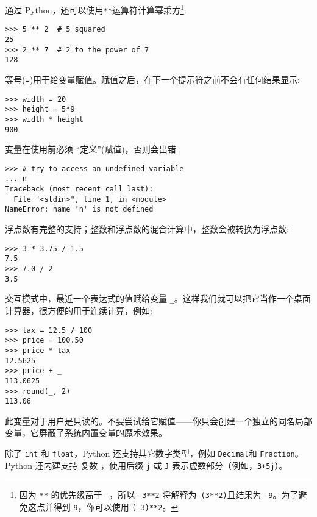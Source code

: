通过 Python，还可以使用\verb|**|运算符计算幂乘方\cprotect\footnote{因为 \verb|**| 的优先级高于 \verb|-|，所以 \texttt{-3**2} 将解释为\texttt{-(3**2)}且结果为 \verb|-9|。为了避免这点并得到 \verb|9|，你可以使用 \texttt{(-3)**2}。}:
\begin{lstlisting}
>>> 5 ** 2  # 5 squared
25
>>> 2 ** 7  # 2 to the power of 7
128
\end{lstlisting}

等号(\verb|=|)用于给变量赋值。赋值之后，在下一个提示符之前不会有任何结果显示:
\begin{lstlisting}
>>> width = 20
>>> height = 5*9
>>> width * height
900
\end{lstlisting}

变量在使用前必须 “定义”(赋值)，否则会出错:
\begin{lstlisting}
>>> # try to access an undefined variable
... n
Traceback (most recent call last):
  File "<stdin>", line 1, in <module>
NameError: name 'n' is not defined
\end{lstlisting}

浮点数有完整的支持；整数和浮点数的混合计算中，整数会被转换为浮点数:
\begin{lstlisting}
>>> 3 * 3.75 / 1.5
7.5
>>> 7.0 / 2
3.5
\end{lstlisting}

交互模式中，最近一个表达式的值赋给变量 \verb|_|。这样我们就可以把它当作一个桌面计算器，很方便的用于连续计算，例如:
\begin{lstlisting}
>>> tax = 12.5 / 100
>>> price = 100.50
>>> price * tax
12.5625
>>> price + _
113.0625
>>> round(_, 2)
113.06
\end{lstlisting}
此变量对于用户是只读的。不要尝试给它赋值——你只会创建一个独立的同名局部变量，它屏蔽了系统内置变量的魔术效果。

除了 \texttt{int} 和 \texttt{float}，Python 还支持其它数字类型，例如 \texttt{Decimal}和 \texttt{Fraction}。Python 还内建支持 复数 ，使用后缀 \verb|j| 或 \verb|J| 表示虚数部分（例如，\verb|3+5j|）。
